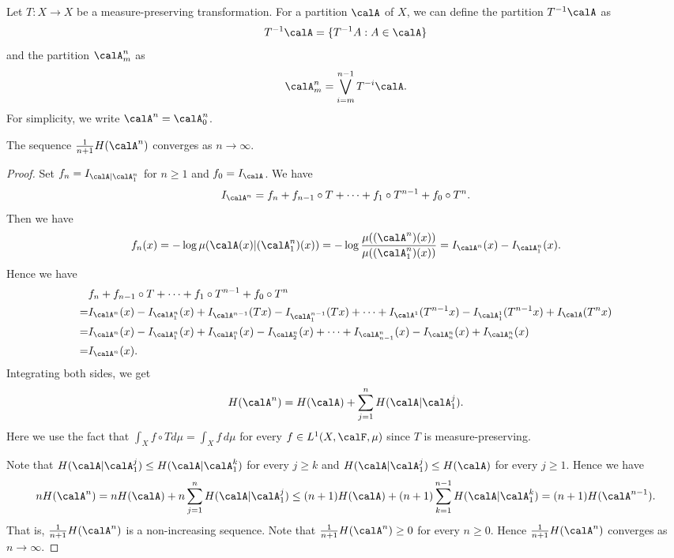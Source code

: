   Let $T: X \to X$ be a measure-preserving transformation. 
  For a partition $\calA$ of $X$, we can define the partition $T^{-1} \calA$ as
  \[ T^{-1} \calA = \{T^{-1} A : A \in \calA\} \]
  and the partition $\calA^n_m$ as
  \[ \calA^n_m = \bigvee_{i=m}^{n-1} T^{-i} \calA. \]
  For simplicity, we write $\calA^n = \calA^n_0$.

  \begin{lemma}
    The sequence $\frac{1}{n+1} H(\calA^n)$ converges as $n \to \infty$.
  \end{lemma}
  \begin{proof}
    Set $f_n = I_{\calA | \calA^n_1}$ for $n \geq 1$ and $f_0 = I_{\calA}$.
    We have 
    \[ I_{\calA^n} = f_n + f_{n-1} \circ T + \cdots + f_1 \circ T^{n-1} + f_0 \circ T^n. \]
    Then we have
    \[ f_n(x) = -\log \mu(\calA(x) | (\calA^n_1)(x)) = -\log \frac{\mu((\calA^n)(x))}{\mu((\calA^{n}_1)(x))} = I_{\calA^n}(x) - I_{\calA^n_1}(x). \]
    Hence we have 
    \begin{align*}
      & f_n + f_{n-1} \circ T + \cdots + f_1 \circ T^{n-1} + f_0 \circ T^n \\
      = & I_{\calA^n}(x) - I_{\calA^n_1}(x) + I_{\calA^{n-1}}(T x) - I_{\calA^{n-1}_1}(T x) + \cdots + I_{\calA^1}(T^{n-1} x) - I_{\calA^1_1}(T^{n-1} x) + I_{\calA}(T^n x) \\
      = & I_{\calA^n}(x) - I_{\calA^n_1}(x) + I_{\calA^{n}_1}(x) - I_{\calA^{n}_2}(x) + \cdots + I_{\calA^n_{n-1}}(x) - I_{\calA^n_n}(x) + I_{\calA^n_n}(x) \\
      = & I_{\calA^n}(x).
    \end{align*}
    Integrating both sides, we get
    \[ H(\calA^n) = H(\calA) + \sum_{j=1}^{n} H(\calA | \calA^j_1). \]
    Here we use the fact that $\int_X f \circ T d \mu = \int_X f \, d\mu$ for every $f \in L^1(X, \calF, \mu)$ since $T$ is measure-preserving.
    
    Note that $H(\calA | \calA^j_1) \leq H(\calA|\calA^k_1)$ for every $j \geq k$ and $H(\calA|\calA^j_1) \leq H(\calA)$ for every $j \geq 1$.
    Hence we have
    \[ n H(\calA^n) = n H(\calA) + n \sum_{j=1}^n H(\calA | \calA^j_1) \leq (n+1) H(\calA) + (n+1) \sum_{k=1}^{n-1} H(\calA | \calA^k_1) = (n+1) H(\calA^{n-1}). \]
    That is, $\frac{1}{n+1} H(\calA^n)$ is a non-increasing sequence.
    Note that $\frac{1}{n+1} H(\calA^n) \geq 0$ for every $n \geq 0$.
    Hence $\frac{1}{n+1} H(\calA^n)$ converges as $n \to \infty$.
  \end{proof}


